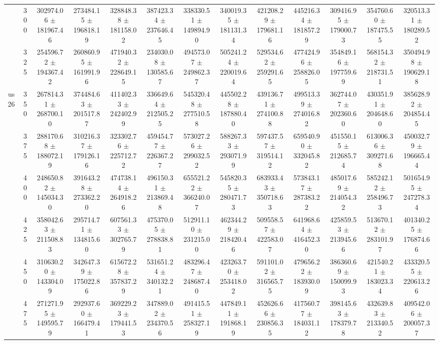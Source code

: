 \begin{table}[h]
{\begin{tabular}{
        ccccccccccccc}
 & 300& 302974.06 $\pm$ 181967.46& 273484.15 $\pm$ 196818.19& 328848.38 $\pm$ 181158.02& 387423.34 $\pm$ 237646.45& 338330.51 $\pm$ 149894.90& 340019.35 $\pm$ 181131.34& 421208.29 $\pm$ 179681.16& 445216.34 $\pm$ 181857.29& 309416.95 $\pm$ 179000.73& 354760.60 $\pm$ 187475.55& 320513.31 $\pm$ 180289.52 \\ 
 & 325& 254596.72 $\pm$ 194367.42& 260860.95 $\pm$ 161991.96& 471940.32 $\pm$ 228649.15& 234030.08 $\pm$ 130585.67& 494573.07 $\pm$ 249862.37& 505241.24 $\pm$ 220019.64& 529534.62 $\pm$ 259291.65& 477424.96 $\pm$ 258826.05& 354849.16 $\pm$ 197759.69& 568154.32 $\pm$ 218731.51& 350494.98 $\pm$ 190629.18 \\ 
\multirow{4}{*}{us26}& 350& 267814.31 $\pm$ 268700.10& 374484.63 $\pm$ 201517.87& 411402.33 $\pm$ 242402.99& 336649.64 $\pm$ 212505.25& 545320.48 $\pm$ 277510.58& 445502.28 $\pm$ 187880.40& 439136.71 $\pm$ 274100.88& 499513.39 $\pm$ 274016.82& 362744.07 $\pm$ 202360.60& 430351.91 $\pm$ 204648.60& 385628.92 $\pm$ 204854.45 \\ 
 & 375& 288170.68 $\pm$ 188072.19& 310216.37 $\pm$ 179126.16& 323302.76 $\pm$ 225712.72& 459454.77 $\pm$ 226367.27& 573027.26 $\pm$ 299032.52& 588267.33 $\pm$ 293071.99& 597437.57 $\pm$ 319514.12& 659540.90 $\pm$ 332045.82& 451550.15 $\pm$ 212685.74& 613006.36 $\pm$ 309271.68& 450032.79 $\pm$ 196665.44 \\ 
 & 400& 248650.82 $\pm$ 145034.30& 391643.28 $\pm$ 273362.20& 474738.14 $\pm$ 264918.26& 496150.31 $\pm$ 213869.48& 655521.22 $\pm$ 366240.07& 545820.35 $\pm$ 280471.73& 683933.43 $\pm$ 350718.63& 573843.17 $\pm$ 287383.22& 485017.69 $\pm$ 214054.32& 585242.12 $\pm$ 258496.73& 501654.95 $\pm$ 247278.34 \\ 
 & 425& 358042.63 $\pm$ 211508.83& 295714.71 $\pm$ 134815.60& 607561.33 $\pm$ 302765.79& 475370.05 $\pm$ 278838.81& 512911.10 $\pm$ 231215.00& 462344.29 $\pm$ 218420.46& 509558.57 $\pm$ 422583.07& 641968.64 $\pm$ 416452.30& 425859.53 $\pm$ 213945.66& 513670.12 $\pm$ 283101.97& 401340.25 $\pm$ 176874.66 \\ 
 & 450& 310630.20 $\pm$ 143304.09& 342647.39 $\pm$ 175022.86& 615672.28 $\pm$ 357837.29& 531651.24 $\pm$ 340132.21& 483296.47 $\pm$ 248687.40& 423263.70 $\pm$ 253418.02& 591101.02 $\pm$ 316565.75& 479656.22 $\pm$ 183930.09& 386360.69 $\pm$ 150099.93& 421540.21 $\pm$ 183023.34& 433320.55 $\pm$ 220613.26 \\ 
 & 475& 271271.95 $\pm$ 149595.79& 292937.60 $\pm$ 166479.41& 369229.23 $\pm$ 179441.53& 347889.02 $\pm$ 234370.56& 491415.51 $\pm$ 258327.19& 447849.11 $\pm$ 191868.19& 452626.66 $\pm$ 230856.35& 417560.77 $\pm$ 184031.12& 398145.63 $\pm$ 178379.78& 432639.83 $\pm$ 213340.52& 409542.06 $\pm$ 200057.37 \\ 

\end{tabular}}
\end{table}
